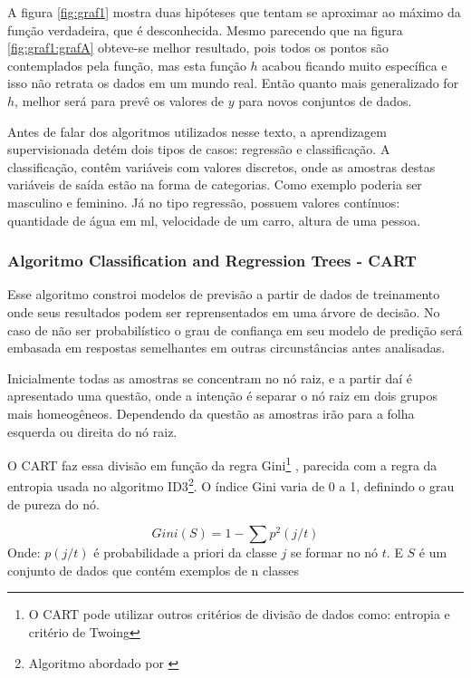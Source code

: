 A figura \ref{fig:graf1} mostra duas hipóteses que tentam se aproximar ao máximo da função verdadeira, que é desconhecida. Mesmo parecendo que  na figura \ref{fig:graf1:grafA} obteve-se melhor resultado, pois todos os pontos são contemplados pela função, mas esta função ${h}$ acabou ficando muito específica e isso não retrata os dados em um mundo real. Então quanto mais  generalizado for ${h}$, melhor será para prevê os valores de ${y}$ para novos conjuntos de dados.

Antes de falar dos algoritmos utilizados nesse texto, a aprendizagem supervisionada detém dois tipos de casos: regressão e classificação. A classificação, contêm variáveis com valores discretos, onde as amostras destas variáveis de saída estão na forma de categorias. Como exemplo poderia ser masculino e feminino. Já no tipo regressão, possuem valores contínuos: quantidade de água em ml, velocidade de um carro, altura de uma pessoa.


\subsubsection{Algoritmo Classification and Regression Trees  - CART}\label{cap:refTeor:sssec:cart}
Esse algoritmo constroi modelos de previsão a partir de dados de treinamento onde seus resultados podem ser reprensentados em uma árvore de decisão. No caso de não ser probabilístico o grau de confiança em seu modelo de predição será embasada em respostas semelhantes em outras circunstâncias antes analisadas. 

Inicialmente todas as amostras se concentram no nó raiz, e a partir daí é apresentado uma questão, onde a intenção é separar o nó raiz em dois grupos mais homeogêneos. Dependendo da questão as amostras irão para a folha esquerda ou direita do nó raiz.

O CART faz essa divisão em função da regra Gini\footnote{O CART pode utilizar outros critérios de divisão de dados como: entropia e critério de Twoing} \cite{braiman1984}, parecida com a regra da entropia usada no algoritmo ID3\footnote{Algoritmo abordado por \cite{Quinlan1986}}. O índice Gini varia de 0 a 1, definindo o grau de pureza do nó. 

\begin{equation}
Gini(S)= 1 - \sum p^2(j/t)
 \label{eq:cartGini}
\end{equation}
Onde: ${p(j/t)}$ é probabilidade a priori da classe ${j}$ se formar no nó ${t}$. E ${S}$ é um conjunto de dados que contém exemplos de n classes

